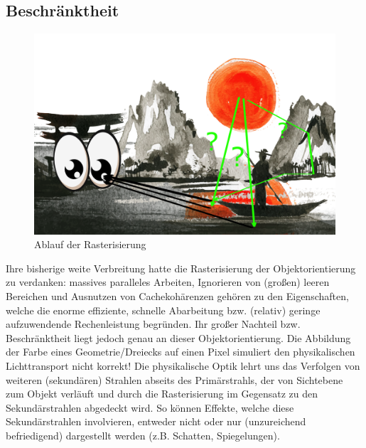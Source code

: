         \subsection{Beschränktheit}
        \label{sec:Rasterisierung:Beschränktheit}
        
        
        \begin{figure}[H]
            \centering
            \includegraphics[width=\linewidth]{content/PathTracer/Bilder/RasterizerGuide.png}
            \caption{Ablauf der Rasterisierung}
            \label{pic:RasterizerGuide}
        \end{figure}

        Ihre bisherige weite Verbreitung hatte die Rasterisierung der Objektorientierung zu verdanken: massives paralleles Arbeiten, Ignorieren von (großen) leeren Bereichen und
        Ausnutzen von Cachekohärenzen gehören zu den Eigenschaften, welche die enorme effiziente, schnelle Abarbeitung bzw. (relativ) geringe aufzuwendende Rechenleistung begründen.
        Ihr großer Nachteil bzw. Beschränktheit liegt jedoch genau an dieser Objektorientierung. 
        Die Abbildung der Farbe eines Geometrie/Dreiecks auf einen Pixel simuliert
        den physikalischen Lichttransport nicht korrekt! Die physikalische Optik lehrt uns das Verfolgen von weiteren (sekundären) Strahlen abseits des Primärstrahls, der von 
        Sichtebene zum Objekt verläuft und durch die Rasterisierung im Gegensatz zu den Sekundärstrahlen abgedeckt wird. So können Effekte, welche diese Sekundärstrahlen involvieren, 
        entweder nicht oder nur (unzureichend befriedigend) dargestellt werden (z.B. Schatten, Spiegelungen). \par

